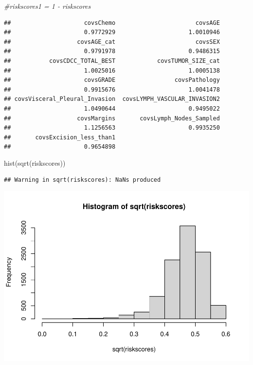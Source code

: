 \documentclass[
  11pt,
]{article}
\newenvironment{Shaded}{\begin{snugshade}}{\end{snugshade}}
\newcommand{\CommentTok}[1]{\textcolor[rgb]{0.56,0.35,0.01}{\textit{#1}}}
\newcommand{\FunctionTok}[1]{\textcolor[rgb]{0.00,0.00,0.00}{#1}}
\newcommand{\NormalTok}[1]{#1}
\newcommand{\OtherTok}[1]{\textcolor[rgb]{0.56,0.35,0.01}{#1}}
\newcommand{\SpecialCharTok}[1]{\textcolor[rgb]{0.00,0.00,0.00}{#1}}
\begin{document}
\begin{Shaded}
\begin{Highlighting}[]
\CommentTok{\#riskscores1 = 1 {-} riskscores}
\end{Highlighting}
\end{Shaded}

\begin{Shaded}
\end{Shaded}

\begin{verbatim}
##                     covsChemo                       covsAGE 
##                     0.9772929                     1.0010946 
##                   covsAGE_cat                       covsSEX 
##                     0.9791978                     0.9486315 
##           covsCDCC_TOTAL_BEST            covsTUMOR_SIZE_cat 
##                     1.0025016                     1.0005138 
##                     covsGRADE                 covsPathology 
##                     0.9915676                     1.0041478 
## covsVisceral_Pleural_Invasion  covsLYMPH_VASCULAR_INVASION2 
##                     1.0490644                     0.9495022 
##                   covsMargins       covsLymph_Nodes_Sampled 
##                     1.1256563                     0.9935250 
##       covsExcision_less_than1 
##                     0.9654898
\end{verbatim}

\begin{Shaded}
\begin{Highlighting}[]
\FunctionTok{hist}\NormalTok{(}\FunctionTok{sqrt}\NormalTok{(riskscores))}
\end{Highlighting}
\end{Shaded}

\begin{verbatim}
## Warning in sqrt(riskscores): NaNs produced
\end{verbatim}

\includegraphics{Hazard_and_Risk_plot_updated_files/figure-latex/unnamed-chunk-12-1.pdf}
\end{document}
